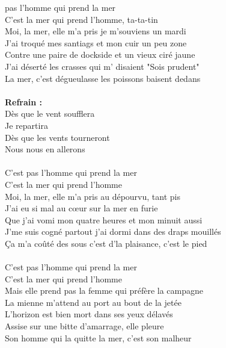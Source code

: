 
 pas l'homme qui prend la mer
\\C'est la mer qui prend l'homme, ta-ta-tin
\\Moi, la mer, elle m'a pris je m'souviens un mardi
\\J'ai troqué mes santiags et mon cuir un peu zone
\\Contre une paire de dockside et un vieux ciré jaune
\\J'ai déserté les crasses qui m' disaient "Sois prudent"
\\La mer, c'est dégueulasse les poissons baisent dedans
\\\\\textbf{Refrain :}
\\Dès que le vent soufflera
\\Je repartira
\\Dès que les vents tourneront
\\Nous nous en allerons
\\\\C'est pas l'homme qui prend la mer
\\C'est la mer qui prend l'homme
\\Moi, la mer, elle m'a pris au dépourvu, tant pis
\\J'ai eu si mal au cœur sur la mer en furie
\\Que j'ai vomi mon quatre heures et mon minuit aussi
\\J'me suis cogné partout j'ai dormi dans des draps mouillés
\\Ça m'a coûté des sous c'est d'la plaisance, c'est le pied
\\\\C'est pas l'homme qui prend la mer
\\C'est la mer qui prend l'homme
\\Mais elle prend pas la femme qui préfère la campagne
\\La mienne m'attend au port au bout de la jetée
\\L'horizon est bien mort dans ses yeux délavés
\\Assise sur une bitte d'amarrage, elle pleure
\\Son homme qui la quitte la mer, c'est son malheur
